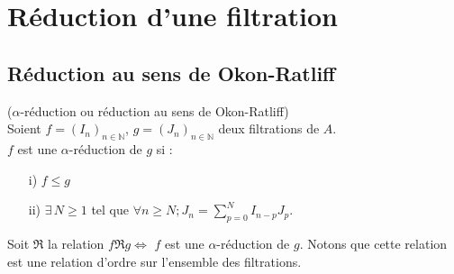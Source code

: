 \section{Réduction d'une filtration}
\subsection{Réduction au sens de Okon-Ratliff}
\begin{madefinition}
	($\alpha$-réduction ou réduction au sens de Okon-Ratliff)\\
	Soient $f=(I_n)_{n \in \mathbb{N}}$, $g=(J_n)_{n \in \mathbb{N}}$ deux filtrations de $A$.\\
	$f$ est une $\alpha$-réduction de $g$ si : \\
	\begin{enumerate}
		\item[i)] $f \leq g$
		\item[ii)] $\exists \, N \geq 1$ tel que $\forall n \geq N ; J_n = \displaystyle \sum_{p=0}^{N}{I_{n-p} J_p}$.
	\end{enumerate}
\end{madefinition}
\begin{maremarque}
	Soit $\Re$ la relation $f \Re g \Leftrightarrow$ $f$ est une $\alpha$-réduction de $g$. Notons que cette relation est une relation d'ordre sur l'ensemble des filtrations.	
\end{maremarque}
